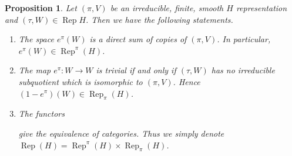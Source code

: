 \documentclass[8pt]{article}
\newtheorem{proposition}{Proposition}[section]
\DeclareMathOperator{\Rep}{Rep}
\begin{document}
\begin{proposition}
  \label{proposition_26}
  Let $(\pi,V)$ be an irreducible, finite, smooth $H$ representation and $(\tau,W)\in\Rep H$. Then we have the following statements.
  \begin{enumerate}[1).]
    \item The space $e^\pi(W)$ is a direct sum of copies of $(\pi,V)$. In particular, $e^\pi(W)\in\Rep^\pi(H)$.
    \item The map $e^\pi:W\to W$ is trivial if and only if $(\tau,W)$ has no irreducible subquotient which is isomorphic to $(\pi,V)$. Hence $(1-e^\pi)(W)\in\Rep_{\pi}(H)$.
    \item The functors 
    \begin{center}
    \end{center}
    give the equivalence of categories. Thus we simply denote $\Rep(H)=\Rep^\pi(H)\times\Rep_\pi(H)$.
  \end{enumerate}
\end{proposition}
\end{document}
